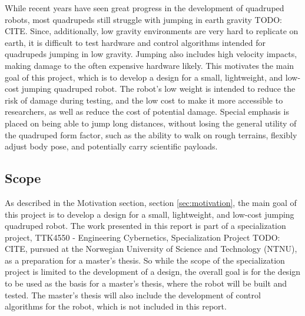 While recent years have seen great progress in the development of quadruped robots, most quadrupeds still struggle with jumping in earth gravity TODO: CITE. Since, additionally, low gravity environments are very hard to replicate on earth, it is difficult to test hardware and control algorithms intended for quadrupeds jumping in low gravity. Jumping also includes high velocity impacts, making damage to the often expensive hardware likely. This motivates the main goal of this project, which is to develop a design for a small, lightweight, and low-cost jumping quadruped robot. The robot's low weight is intended to reduce the risk of damage during testing, and the low cost to make it more accessible to researchers, as well as reduce the cost of potential damage. Special emphasis is placed on being able to jump long distances, without losing the general utility of the quadruped form factor, such as the ability to walk on rough terrains, flexibly adjust body pose, and potentially carry scientific payloads.

\subsection{Scope}

As described in the Motivation section, section \ref{sec:motivation}, the main goal of this project is to develop a design for a small, lightweight, and low-cost jumping quadruped robot. The work presented in this report is part of a specialization project, TTK4550 - Engineering Cybernetics, Specialization Project TODO: CITE, pursued at the Norwegian University of Science and Technology (NTNU), as a preparation for a master's thesis. So while the scope of the specialization project is limited to the development of a design, the overall goal is for the design to be used as the basis for a master's thesis, where the robot will be built and tested. The master's thesis will also include the development of control algorithms for the robot, which is not included in this report.

